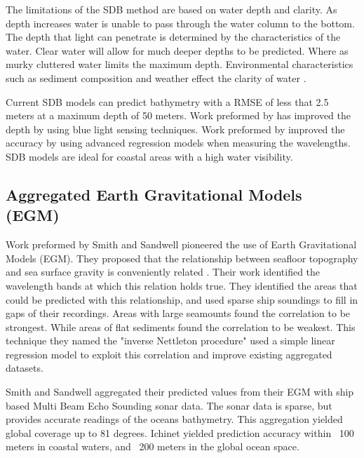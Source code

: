 \par
The limitations of the \ac{SDB} method are based on water depth and clarity.
As depth increases water is unable to pass through the water column to the bottom.
The depth that light can penetrate is determined by the characteristics of the water.
Clear water will allow for much deeper depths to be predicted.
Where as murky cluttered water limits the maximum depth.
Environmental characteristics such as sediment composition and weather effect the clarity of water \cite{vinayaraj2016satellite}.

\par
Current \ac{SDB} models can predict bathymetry with a \ac{RMSE} of less that 2.5 meters at a maximum depth of 50 meters.
Work preformed by \cite{vinayaraj2016satellite} has improved the depth by using blue light sensing techniques.
Work preformed by \cite{chybicki2018three} improved the accuracy by using advanced regression models when measuring the wavelengths.
\ac{SDB} models are ideal for coastal areas with a high water visibility.

\subsection{Aggregated Earth Gravitational Models (EGM)}
Work preformed by Smith and Sandwell \cite{smith1994bathymetric}\cite{smith1997global} pioneered the use of Earth Gravitational Models (EGM).
They proposed that the relationship between seafloor topography and sea surface gravity is conveniently related \cite{smith1994bathymetric}.
Their work identified the wavelength bands at which this relation holds true.
They identified the areas that could be predicted with this relationship, and used sparse ship soundings to fill in gaps of their recordings.
Areas with large seamounts found the correlation to be strongest.
While areas of flat sediments found the correlation to be weakest.
This technique they named the "inverse Nettleton procedure" used a simple linear regression model to exploit this correlation and improve existing aggregated datasets.

\par
Smith and Sandwell aggregated their predicted values from their \ac{EGM} with ship based Multi Beam Echo Sounding sonar data.
The sonar data is sparse, but provides accurate readings of the oceans bathymetry.
This aggregation yielded global coverage up to 81 degrees.
Ichinet yielded prediction accuracy within ~100 meters in coastal waters, and ~200 meters in the global ocean space.

